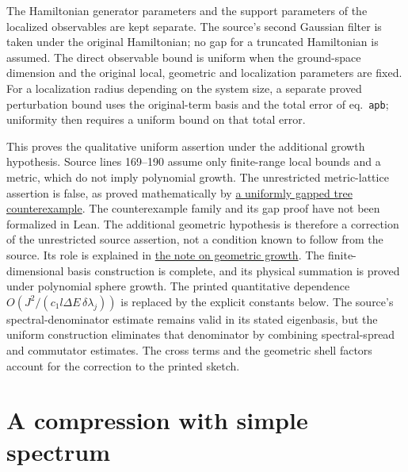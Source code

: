 \documentclass{article}
\begin{document}
The Hamiltonian generator parameters and the support parameters of the localized
observables are kept separate. The source's second Gaussian filter is taken
under the original Hamiltonian; no gap for a truncated Hamiltonian is assumed.
The direct observable bound is uniform when the ground-space dimension and
the original local, geometric and localization parameters are fixed. For a
localization radius depending on the system size, a separate proved perturbation
bound uses the original-term basis and the total error of eq.~\texttt{apb};
uniformity then requires a uniform bound on that total error.

This proves the qualitative uniform assertion under the additional growth
hypothesis. Source lines 169--190 assume only finite-range local bounds and a
metric, which do not imply polynomial growth. The unrestricted metric-lattice
assertion is false, as proved mathematically by
\href{https://sirui-lu.com/TNLean/paper-gaps/hastings05_tree_basis_counterexample.pdf}
{a uniformly gapped tree counterexample}. The counterexample family and
its gap proof have not been formalized in Lean. The additional geometric
hypothesis is therefore a correction of the unrestricted source assertion,
not a condition known to follow from the source. Its role is explained in
\href{https://sirui-lu.com/QICLean/paper-gaps/hastings05_geometric_growth_scope.pdf}
{the note on geometric growth}. The finite-dimensional basis construction is
complete, and its physical summation is proved under polynomial sphere growth.
The printed quantitative
dependence $O(J^2/(c_1l\Delta E\,\delta\lambda_j))$ is replaced by the explicit
constants below. The source's spectral-denominator estimate remains valid in
its stated eigenbasis, but the uniform construction eliminates that denominator
by combining spectral-spread and commutator estimates. The cross terms and the
geometric shell factors account for the correction to the printed sketch.

\section{A compression with simple spectrum}
\end{document}
